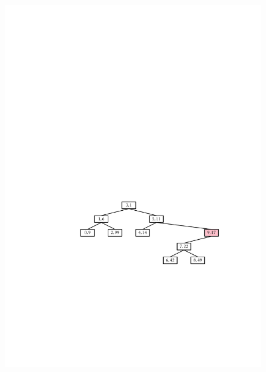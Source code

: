 \begin{figure}
  \begin{center}
  \includegraphics[height=\QuarterHeightScaleIfNeeded]{figs/treap-delete-a} \\

\end{center}
\end{figure}
